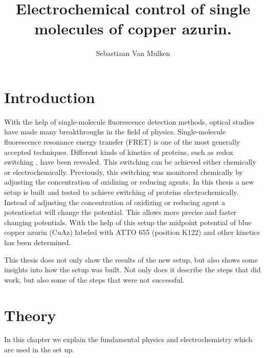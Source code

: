 \documentclass[twoside,single]{lion-msc}
\title{Electrochemical control of single molecules of copper azurin.}
\author{Sebastiaan Van Mulken}
\begin{document}
\maketitle



\chapter{Introduction}
With the help of single-molecule fluorescence detection methods, optical studies have made many breakthroughs in the field of physics. Single-molecule fluorescence resonance energy transfer (FRET) is one of the most generally accepted techniques. Different kinds of kinetics of proteins, such as redox switching \cite{Akklc}, have been revealed. This switching can be achieved either chemically or electrochemically. Previously, this switching was monitored chemically by adjusting the concentration of oxidizing or reducing agents. In this thesis a new setup is built and tested to achieve switching of proteins electrochemically. Instead of adjusting the concentration of oxidizing or reducing agent a potentiostat will change the potential. This allows more precise and faster changing potentials. With the help of this setup the midpoint potential of blue copper azurin (CuAz) labeled with ATTO 655 (position K122) and other kinetics has been determined. 

This thesis does not only show the results of the new setup, but also shows some insights into how the setup was built. Not only does it describe the steps that did work, but also some of the steps that were not successful. 


\chapter{Theory}
In this chapter we explain the fundamental physics and electrochemistry which are used in the set up.
\end{document}
